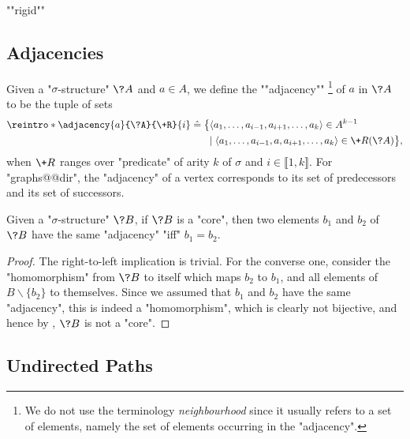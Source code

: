 \begin{itemize}
	\itemAP ""rigid""
\end{itemize}

\subsection{Adjacencies}

Given a "$\sigma$-structure" $\?A$ and $a \in A$, we define the \AP""adjacency""%
\footnote{We do not use the terminology \emph{neighbourhood} since it usually refers
to a set of elements, namely the set of elements occurring in the "adjacency".}
of $a$ in $\?A$ to be the tuple of sets%
\AP{}
\begin{align*}
	\reintro*\adjacency{a}{\?A}{\+R}{i} & \defeq
		\big\{
			\langle a_1, \dotsc, a_{i-1}, a_{i+1}, \dotsc, a_k \rangle \in A^{k-1}
			\\ & \hphantom{\defeq \big\{ }\mid
			\langle a_1, \dotsc, a_{i-1}, a, a_{i+1}, \dotsc, a_k \rangle \in \+R(\?A)
		\big\},
\end{align*}
when $\+R$ ranges over "predicate" of arity $k$ of $\sigma$ and $i \in \lBrack 1,k\rBrack$. 
For "graphs@@dir", the "adjacency" of a vertex corresponds to its set of predecessors and
its set of successors.

\begin{proposition}
	\AP\label{prop:adjacency-core}
	Given a "$\sigma$-structure" $\?B$, if $\?B$ is a "core", then
	two elements $b_1$ and $b_2$ of $\?B$ have the same "adjacency" "iff" $b_1 = b_2$.
\end{proposition}

\begin{proof}
	The right-to-left implication is trivial.
	For the converse one, consider the "homomorphism" from $\?B$ to itself
	which maps $b_2$ to $b_1$, and all elements of $B \smallsetminus \{b_2\}$
	to themselves. Since we assumed that $b_1$ and $b_2$ have the same "adjacency",
	this is indeed a "homomorphism", which is clearly not bijective, and
	hence by , $\?B$ is not a "core".
\end{proof}

\subsection{Undirected Paths}

